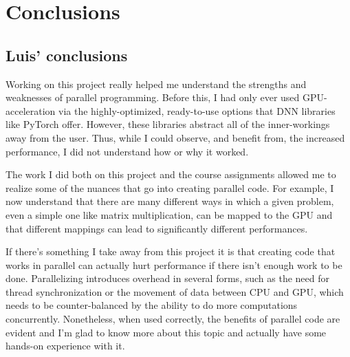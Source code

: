 \section{Conclusions}

\subsection{Luis' conclusions}

Working on this project really helped me understand the strengths and weaknesses of parallel programming. Before this, I had only ever used GPU-acceleration via the highly-optimized, ready-to-use options that DNN libraries like PyTorch offer. However, these libraries abstract all of the inner-workings away from the user. Thus, while I could observe, and benefit from, the increased performance, I did not understand how or why it worked. 

The work I did both on this project and the course assignments allowed me to realize some of the nuances that go into creating parallel code. For example, I now understand that there are many different ways in which a given problem, even a simple one like matrix multiplication, can be mapped to the GPU and that different mappings can lead to significantly different performances.

If there's something I take away from this project it is that creating code that works in parallel can actually hurt performance if there isn't enough work to be done. Parallelizing introduces overhead in several forms, such as the need for thread synchronization or the movement of data between CPU and GPU, which needs to be counter-balanced by the ability to do more computations concurrently. Nonetheless, when used correctly, the benefits of parallel code are evident and I'm glad to know more about this topic and actually have some hands-on experience with it.
